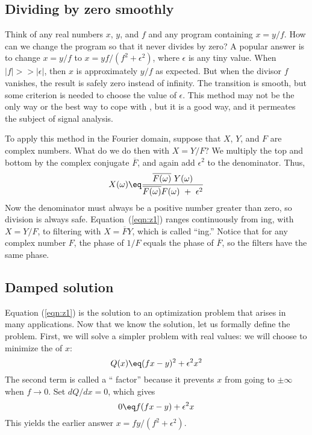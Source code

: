 \subsection{Dividing by zero smoothly}
Think of any real numbers $x$, $y$, and $f$ and any
program containing $x=y/f$.
How can we change the program so that it never divides by zero?
A popular answer is to change $x=y/f$
to $x=yf/(f^2+\epsilon^2)$, where $\epsilon$ is any tiny value.
When $|f| >> |\epsilon|$,
then $x$ is approximately $y/f$ as expected.
But when the divisor $f$ vanishes,
the result is safely zero instead of infinity.
The transition is smooth,
but some criterion is needed to choose the value of $\epsilon$.
This method may not be the only way or the best way
to cope with
,
but it is a good way,
and it permeates the subject of signal analysis.

\par
To apply this method in the Fourier domain,
suppose that $X$, $Y$, and $F$ are complex numbers.
What do we do then with $X=Y/F$?
We multiply the
top and bottom by the complex conjugate $\overline{F}$,
and again add $\epsilon^2$ to the denominator.
Thus,
\begin{equation}
X(\omega) \eq
\frac{ \overline{F(\omega)} \ Y(\omega)  }{ \overline{F(\omega)} F(\omega) \ +\ \epsilon^2}
\label{eqn:z1}
\end{equation}
Now the denominator must always be a positive number greater than zero,
so division is always safe.
Equation~(\ref{eqn:z1}) ranges continuously from
ing, with
$X=Y/F$, to filtering with $X=\overline{F}Y$,
which is called ``ing.''
Notice that for any complex number $F$,
the phase of $1/F$ equals the phase of $\overline{F}$,
so the filters 
have the same phase.

\subsection{Damped solution}
Equation (\ref{eqn:z1}) is the solution to an optimization problem
that arises in many applications.
Now that we know the solution, let us formally define the problem.
First, we will solve a simpler problem with real values:
we will choose to minimize the  of $x$:
\begin{equation}
Q(x) \eq (f x-y)^2 + \epsilon^2 x^2
\label{eqn:z2}
\end{equation}
The second term is called a `` factor''
because it prevents $x$ from going to $\pm \infty$ when $f\rightarrow 0$.
Set $dQ/dx=0$, which gives
\begin{equation}
0 \eq f(f x-y) + \epsilon^2 x
\label{eqn:z3}
\end{equation}
This yields the earlier answer $x=fy/(f^2+\epsilon^2)$.

